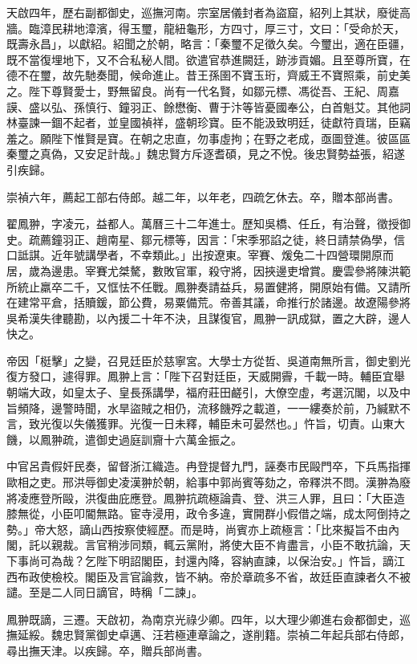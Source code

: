 \begin{pinyinscope}
天啟四年，歷右副都御史，巡撫河南。宗室居儀封者為盜窟，紹列上其狀，廢徙高牆。臨漳民耕地漳濱，得玉璽，龍紐龜形，方四寸，厚三寸，文曰：「受命於天，既壽永昌」，以獻紹。紹聞之於朝，略言：「秦璽不足徵久矣。今璽出，適在臣疆，既不當復埋地下，又不合私秘人間。欲遣官恭進闕廷，跡涉貢媚。且至尊所寶，在德不在璽，故先馳奏聞，候命進止。昔王孫圉不寶玉珩，齊威王不寶照乘，前史美之。陛下尊賢愛士，野無留良。尚有一代名賢，如鄒元標、馮從吾、王紀、周嘉謨、盛以弘、孫慎行、鐘羽正、餘懋衡、曹于汴等皆憂國奉公，白首魁艾。其他詞林臺諫一錮不起者，並皇國禎祥，盛朝珍寶。臣不能汲致明廷，徒獻符貢瑞，臣竊羞之。願陛下惟賢是寶。在朝之忠直，勿事虛拘；在野之老成，亟圖登進。彼區區秦璽之真偽，又安足計哉。」魏忠賢方斥逐耆碩，見之不悅。後忠賢勢益張，紹遂引疾歸。

崇禎六年，薦起工部右侍郎。越二年，以年老，四疏乞休去。卒，贈本部尚書。

翟鳳翀，字凌元，益都人。萬曆三十二年進士。歷知吳橋、任丘，有治聲，徵授御史。疏薦鐘羽正、趙南星、鄒元標等，因言：「宋季邪諂之徒，終日請禁偽學，信口詆諆。近年號講學者，不幸類此。」出按遼東。宰賽、煖兔二十四營環開原而居，歲為邊患。宰賽尤桀驁，數敗官軍，殺守將，因挾邊吏增賞。慶雲參將陳洪範所統止羸卒二千，又恇怯不任戰。鳳翀奏請益兵，易置健將，開原始有備。又請所在建常平倉，括贖鍰，節公費，易粟備荒。帝善其議，命推行於諸邊。故遼陽參將吳希漢失律聽勘，以內援二十年不決，且謀復官，鳳翀一訊成獄，置之大辟，邊人快之。

帝因「梃擊」之變，召見廷臣於慈寧宮。大學士方從哲、吳道南無所言，御史劉光復方發口，遽得罪。鳳翀上言：「陛下召對廷臣，天威開霽，千載一時。輔臣宜舉朝端大政，如皇太子、皇長孫講學，福府莊田鹺引，大僚空虛，考選沉閣，以及中旨頻降，邊警時聞，水旱盜賊之相仍，流移饑殍之載道，一一縷奏於前，乃緘默不言，致光復以失儀獲罪。光復一日未釋，輔臣未可晏然也。」忤旨，切責。山東大饑，以鳳翀疏，遣御史過庭訓齎十六萬金振之。

中官呂貴假奸民奏，留督浙江織造。冉登提督九門，誣奏市民毆門卒，下兵馬指揮歐相之吏。邢洪辱御史凌漢翀於朝，給事中郭尚賓等劾之，帝釋洪不問。漢翀為廢將凌應登所毆，洪復曲庇應登。鳳翀抗疏極論貴、登、洪三人罪，且曰：「大臣造膝無從，小臣叩閽無路。宦寺浸用，政令多違，實開群小假借之端，成太阿倒持之勢。」帝大怒，謫山西按察使經歷。而是時，尚賓亦上疏極言：「比來擬旨不由內閣，託以親裁。言官稍涉同類，輒云黨附，將使大臣不肯盡言，小臣不敢抗論，天下事尚可為哉？乞陛下明詔閣臣，封還內降，容納直諫，以保治安。」忤旨，謫江西布政使檢校。閣臣及言官論救，皆不納。帝於章疏多不省，故廷臣直諫者久不被譴。至是二人同日謫官，時稱「二諫」。

鳳翀既謫，三遷。天啟初，為南京光祿少卿。四年，以大理少卿進右僉都御史，巡撫延綏。魏忠賢黨御史卓邁、汪若極連章論之，遂削籍。崇禎二年起兵部右侍郎，尋出撫天津。以疾歸。卒，贈兵部尚書。


\end{pinyinscope}
